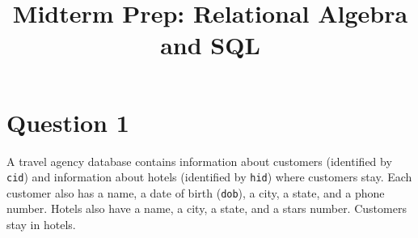 \documentclass[letterpaper, 11pt]{article}
\title{Midterm Prep: Relational Algebra and SQL}
\author{}
\date{}
\begin{document}
\maketitle

\vspace{-4em}

\section*{Question 1}

A travel agency database contains information about customers (identified by \texttt{cid}) and information about hotels (identified by \texttt{hid}) where customers stay. Each customer also has a name, a date of birth (\texttt{dob}), a city, a state, and a phone number. Hotels also have a name, a city, a state, and a stars number. Customers stay in hotels.
\end{document}
